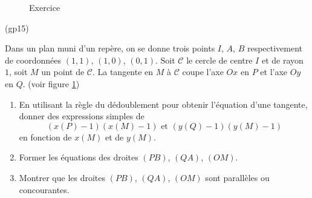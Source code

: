 \begin{figure}[ht]
 \centering

\caption{Exercice }
\label{fig:Egp15_1}
\end{figure}
\begin{tiny}(gp15)\end{tiny}
Dans un plan muni d'un repère, on se donne trois points $I$, $A$, $B$ respectivement de coordonnées $(1,1)$, $(1,0)$, $(0,1)$. Soit $\mathcal C$ le cercle de centre $I$ et de rayon $1$, soit $M$ un point de $\mathcal C$. La tangente en $M$ à $\mathcal C$ coupe l'axe $Ox$ en $P$ et l'axe $Oy$ en $Q$. (voir figure \ref{fig:Egp15_1})
\begin{enumerate}
 \item En utilisant la règle du dédoublement pour obtenir l'équation d'une tangente, donner des expressions simples de
\begin{displaymath}
(x(P)-1)(x(M)-1) \text{ et }(y(Q)-1)(y(M)-1) 
\end{displaymath}
en fonction de $x(M)$ et de $y(M)$.
 \item Former les équations des droites $(PB)$, $(QA)$, $(OM)$.
 \item Montrer que les droites $(PB)$, $(QA)$, $(OM)$ sont parallèles ou concourantes.
\end{enumerate}
